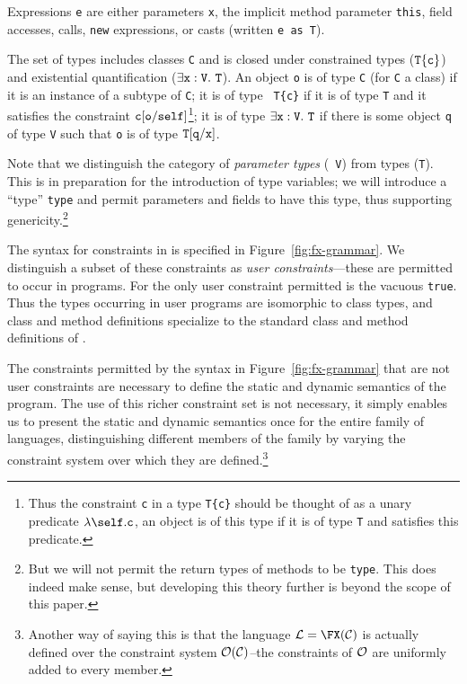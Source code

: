 Expressions {\tt e} are either parameters {\tt x}, the implicit
method parameter {\tt this}, field accesses, calls, {\tt new}
expressions, or casts (written {\tt e as T}).

The set of types includes classes {\tt C} and is closed under
constrained types (${\tt T\{c\}}$) and existential
quantification ($\exists {\tt x}:{\tt V}.~{\tt T}$).
%
An object {\tt o} is of type {\tt C} (for {\tt C} a class)
if it is an instance of a subtype of {\tt C}; it is of type {\tt
T\{c\}} if it is of type {\tt T} and it satisfies the constraint $\tt
c[o/self]$\footnote{Thus the constraint {\tt c} in a type {\tt T\{c\}}
should be thought of as a unary predicate $\lambda\self.{\tt c}$, an
object is of this type if it is of type {\tt T} and satisfies this
predicate.}; it is of type
                $\exists {\tt x}:{\tt V}.~{\tt T}$
if there is some object {\tt q}
of type {\tt V} such that {\tt o} is of type
${\tt T}[{\tt q}/{\tt x}]$.

%
Note that we distinguish the category of {\em parameter types} ({\tt
V}) from types ({\tt T}). This is in preparation for the introduction
of type variables; we will introduce a ``type'' {\tt type} and permit
parameters and fields to have this type, thus supporting
genericity.\footnote{But we will not permit the return types of
methods to be {\tt type}. This does indeed make sense, but developing
this theory further is beyond the scope of this paper.}

The syntax for constraints in \FXZ{} is specified in
Figure~\ref{fig:fx-grammar}. We distinguish a subset of these constraints as
{\em user constraints}---these are permitted to occur in
programs. For \FXZ{} the only user constraint permitted is the vacuous
{\tt true}. Thus the types occurring in user programs are isomorphic
to class types, and class and method definitions specialize to the
standard class and method definitions of \FJ{}. 

The constraints permitted by the syntax in
Figure~\ref{fig:fx-grammar} that
are not user constraints are necessary to define the static and
dynamic semantics of the program.
The use of this richer constraint set is
not necessary, it simply enables us to present the static and dynamic
semantics once for the entire family of \FX{} languages,
distinguishing different members of the family by varying the
constraint system over which they are defined.\footnote{Another way of
saying this is that the language ${\cal L}=\FX({\cal C})$ is actually
defined over the constraint system ${\cal O}({\cal C})$--the constraints
of $\cal O$ are uniformly added to every \FX{} member.}


